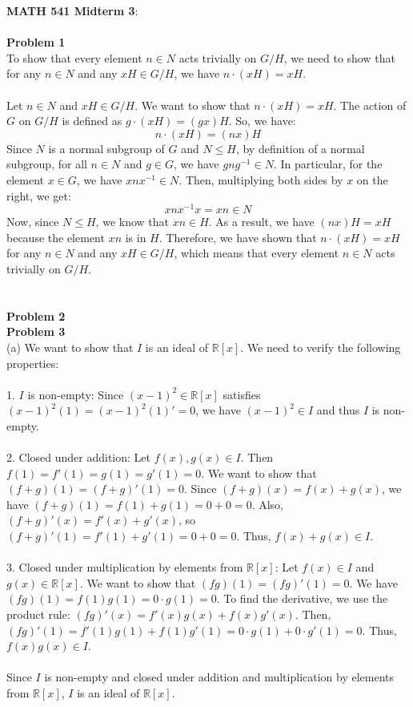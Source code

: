 \documentclass{article}
\begin{document}
\noindent \textbf{MATH 541 Midterm 3}: \\\\
\noindent \textbf{Problem 1} \\
To show that every element $n \in N$ acts trivially on $G / H$, we need to show that for any $n \in N$ and any $x H \in G / H$, we have $n \cdot(x H) = x H$.\\\\
Let $n \in N$ and $x H \in G / H$. We want to show that $n \cdot(x H) = x H$. The action of $G$ on $G / H$ is defined as $g \cdot(x H) = (gx) H$. So, we have:
$$
n \cdot(x H)=(n x) H
$$
Since $N$ is a normal subgroup of $G$ and $N \leq H$, by definition of a normal subgroup, for all $n \in N$ and $g \in G$, we have $g n g^{-1} \in N$. In particular, for the element $x \in G$, we have $x n x^{-1} \in N$. Then, multiplying both sides by $x$ on the right, we get:
$$
x n x^{-1} x=x n \in N
$$
Now, since $N \leq H$, we know that $x n \in H$. As a result, we have $(n x) H = x H$ because the element $x n$ is in $H$. Therefore, we have shown that $n \cdot(x H) = x H$ for any $n \in N$ and any $x H \in G / H$, which means that every element $n \in N$ acts trivially on $G / H$.\\\\
\\
\noindent \textbf{Problem 2} \\




\noindent \textbf{Problem 3} \\
(a) We want to show that $I$ is an ideal of $\mathbb{R}[x]$. We need to verify the following properties:\\\\
1. $I$ is non-empty: Since $(x-1)^2 \in \mathbb{R}[x]$ satisfies $(x-1)^2(1) = (x-1)^2(1)' = 0$, we have $(x-1)^2 \in I$ and thus $I$ is non-empty.\\\\
2. Closed under addition: Let $f(x), g(x) \in I$. Then $f(1) = f'(1) = g(1) = g'(1) = 0$. We want to show that $(f+g)(1) = (f+g)'(1) = 0$. Since $(f+g)(x) = f(x) + g(x)$, we have $(f+g)(1) = f(1) + g(1) = 0 + 0 = 0$. Also, $(f+g)'(x) = f'(x) + g'(x)$, so $(f+g)'(1) = f'(1) + g'(1) = 0 + 0 = 0$. Thus, $f(x) + g(x) \in I$.\\\\
3. Closed under multiplication by elements from $\mathbb{R}[x]$: Let $f(x) \in I$ and $g(x) \in \mathbb{R}[x]$. We want to show that $(fg)(1) = (fg)'(1) = 0$. We have $(fg)(1) = f(1)g(1) = 0 \cdot g(1) = 0$. To find the derivative, we use the product rule: $(fg)'(x) = f'(x)g(x) + f(x)g'(x)$. Then, $(fg)'(1) = f'(1)g(1) + f(1)g'(1) = 0 \cdot g(1) + 0 \cdot g'(1) = 0$. Thus, $f(x)g(x) \in I$.\\\\
Since $I$ is non-empty and closed under addition and multiplication by elements from $\mathbb{R}[x]$, $I$ is an ideal of $\mathbb{R}[x]$.\\\\
\end{document}
